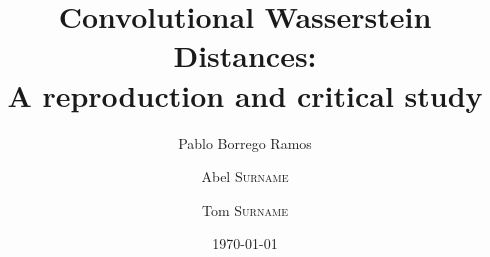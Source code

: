 \documentclass[11pt]{article}
\title{Convolutional Wasserstein Distances:\\
\large A reproduction and critical study}
\author{Pablo Borrego Ramos \and Abel \textsc{Surname} \and Tom \textsc{Surname}}
\date{\today}
\theoremstyle{plain}
\theoremstyle{remark}
\begin{document}
\maketitle

\begin{abstract}
\end{abstract}










\end{document}
